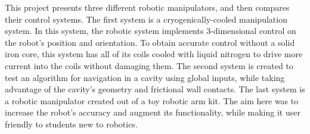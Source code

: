 

This project presents three different robotic manipulators, and then compares their control systems. The first system is a cryogenically-cooled manipulation system. In this system, the robotic system implements 3-dimensional control on the robot’s position and orientation. To obtain accurate control without a solid iron core, this system has all of its coils cooled with liquid nitrogen to drive more current into the coils without damaging them. The second system is created to test an algorithm for navigation in a cavity using global inputs, while taking advantage of the cavity’s geometry and frictional wall contacts. The last system is a robotic manipulator created out of a toy robotic arm kit. The aim here was to increase the robot’s accuracy and augment its functionality, while making it user friendly to students new to robotics.